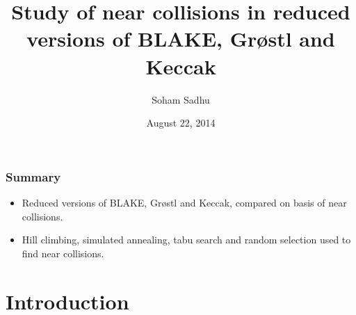 \documentclass{beamer}
\begin{document}
\title{Study of near collisions in reduced versions of BLAKE, Gr{\o}stl and Keccak}  
\author{Soham Sadhu}
\date{August 22, 2014} 

\begin{frame}
\titlepage
\end{frame}


\begin{frame}
  \frametitle{Summary}
  \begin{itemize}
    \item Reduced versions of BLAKE, Gr{\o}stl and Keccak, compared on basis of near collisions.
    \item Hill climbing, simulated annealing, tabu search and random selection used to find near 
      collisions.
  \end{itemize}
\end{frame}


\section{Introduction}
\end{document}
